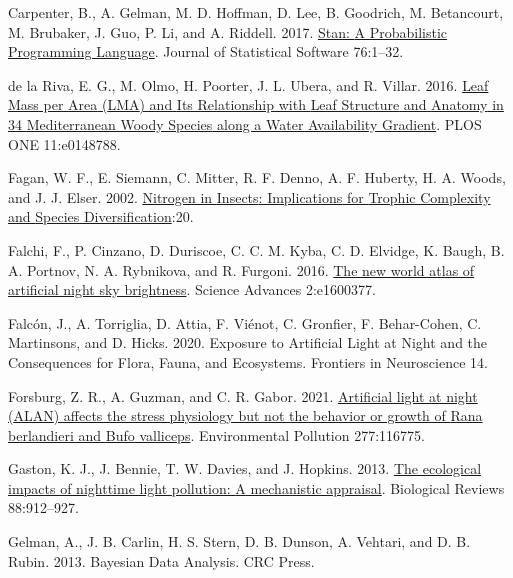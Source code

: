 \documentclass[
  12pt,
  letterpaper,
  DIV=11,
  numbers=noendperiod]{scrartcl}
\newlength{\cslhangindent}
\newlength{\cslentryspacingunit} %
\newenvironment{CSLReferences}[2] %
 {%
  \setlength{\parindent}{0pt}
  \ifodd #1
  \let\oldpar\par
  \def\par{\hangindent=\cslhangindent\oldpar}
  \fi
  \setlength{\parskip}{#2\cslentryspacingunit}
 }%
 {}
\begin{document}
\begin{CSLReferences}{1}{0}
\leavevmode{}%
Carpenter, B., A. Gelman, M. D. Hoffman, D. Lee, B. Goodrich, M.
Betancourt, M. Brubaker, J. Guo, P. Li, and A. Riddell. 2017.
\href{https://doi.org/10.18637/jss.v076.i01}{Stan: {A Probabilistic
Programming Language}}. Journal of Statistical Software 76:1--32.

\leavevmode{}%
de la Riva, E. G., M. Olmo, H. Poorter, J. L. Ubera, and R. Villar.
2016. \href{https://doi.org/10.1371/journal.pone.0148788}{Leaf {Mass}
per {Area} ({LMA}) and {Its Relationship} with {Leaf Structure} and
{Anatomy} in 34 {Mediterranean Woody Species} along a {Water
Availability Gradient}}. PLOS ONE 11:e0148788.

\leavevmode{}%
Fagan, W. F., E. Siemann, C. Mitter, R. F. Denno, A. F. Huberty, H. A.
Woods, and J. J. Elser. 2002.
\href{https://doi.org/10.1086/343879}{Nitrogen in {Insects}:
{Implications} for {Trophic Complexity} and {Species
Diversification}}:20.

\leavevmode{}%
Falchi, F., P. Cinzano, D. Duriscoe, C. C. M. Kyba, C. D. Elvidge, K.
Baugh, B. A. Portnov, N. A. Rybnikova, and R. Furgoni. 2016.
\href{https://doi.org/10.1126/sciadv.1600377}{The new world atlas of
artificial night sky brightness}. Science Advances 2:e1600377.

\leavevmode{}%
Falcón, J., A. Torriglia, D. Attia, F. Viénot, C. Gronfier, F.
Behar-Cohen, C. Martinsons, and D. Hicks. 2020. Exposure to {Artificial
Light} at {Night} and the {Consequences} for {Flora}, {Fauna}, and
{Ecosystems}. Frontiers in Neuroscience 14.

\leavevmode{}%
Forsburg, Z. R., A. Guzman, and C. R. Gabor. 2021.
\href{https://doi.org/10.1016/j.envpol.2021.116775}{Artificial light at
night ({ALAN}) affects the stress physiology but not the behavior or
growth of {Rana} berlandieri and {Bufo} valliceps}. Environmental
Pollution 277:116775.

\leavevmode{}%
Gaston, K. J., J. Bennie, T. W. Davies, and J. Hopkins. 2013.
\href{https://doi.org/10.1111/brv.12036}{The ecological impacts of
nighttime light pollution: {A} mechanistic appraisal}. Biological
Reviews 88:912--927.

\leavevmode{}%
Gelman, A., J. B. Carlin, H. S. Stern, D. B. Dunson, A. Vehtari, and D.
B. Rubin. 2013. Bayesian {Data Analysis}. {CRC Press}.


\end{CSLReferences}
\end{document}
